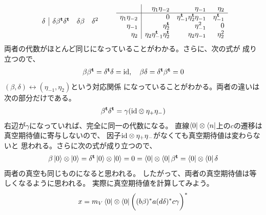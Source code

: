 {\begin{note}[証明のカギ]
\begin{description}
\begin{equation*}
\begin{split}
\begin{array}{r|rrr}
					\delta & \delta\beta^{\mathbf{t}}\delta^{\mathbf{t}} & \delta\beta & \delta^2 \\
				\end{array}\qquad \begin{array}{r|rrr}
					& \eta_1\eta_{-2} & \eta_{-1} & \eta_2 \\\hline
					\eta_1\eta_{-2} & 0 & \eta_{-1}^{\mathbf{t}}\eta_2^{\mathbf{t}}\eta_{-1} 
						& \eta_{-1}^{\mathbf{t}} \\
					\eta_{-1} & \eta_2^{\mathbf{t}} & \eta_{-1}^2 & 0 \\
					\eta_2 & \eta_2\eta_{-1}^{\mathbf{t}}\eta_2^{\mathbf{t}} & \eta_2\eta_{-1} 
						& \eta_2^2 \\
				\end{array}
			\end{split}\end{equation*}
			両者の代数がほとんど同じになっていることがわかる。さらに、次の式が
			成り立つので、
			\begin{equation*}\begin{array}{rcll}
				\beta\beta^{\mathbf{t}} = \delta^{\mathbf{t}}\delta = {\operatorname{id}},\quad
				\beta\delta = \delta^{\mathbf{t}}\beta^{\mathbf{t}} = 0
			\end{array}\end{equation*}
			$(\beta,\delta)\leftrightarrow(\eta_{-1},\eta_2)$という対応関係
			になっていることがわかる。両者の違いは次の部分だけである。
			\begin{equation*}\begin{split}
				\beta^{\mathbf{t}}\delta^{\mathbf{t}} = \gamma({\operatorname{id}}\otimes\eta_+\eta_-)
			\end{split}\end{equation*}
			右辺が$\gamma$になっていれば、完全に同一の代数になる。
			直線$\mathinner{\langle{0}|}\otimes\mathinner{\langle{n}|}$上の$c$の遷移は真空期待値に寄与しないので、
			因子${\operatorname{id}}\otimes\eta_+\eta_-$がなくても真空期待値は変わらないと
			思われる。さらに次の式が成り立つので、
			\begin{equation*}\begin{array}{rcll}
				\beta\mathinner{|{0}\rangle}\otimes\mathinner{|{0}\rangle} = \delta^{\mathbf{t}}\mathinner{|{0}\rangle}\otimes\mathinner{|{0}\rangle}
				= 0 = \mathinner{\langle{0}|}\otimes\mathinner{\langle{0}|}\beta^{\mathbf{t}}
				= \mathinner{\langle{0}|}\otimes\mathinner{\langle{0}|}\delta
			\end{array}\end{equation*}
			両者の真空も同じものになると思われる。
			したがって、両者の真空期待値は等しくなるように思われる。
			実際に真空期待値を計算してみよう。
			\begin{equation*}\begin{split}
				x = m_V\bra{0}\otimes\bra{0}
					\biggl((b\beta)^*a(d\delta)^*c\gamma\biggr)^*

\end{split}
\end{equation*}
\end{description}
\end{note}}
